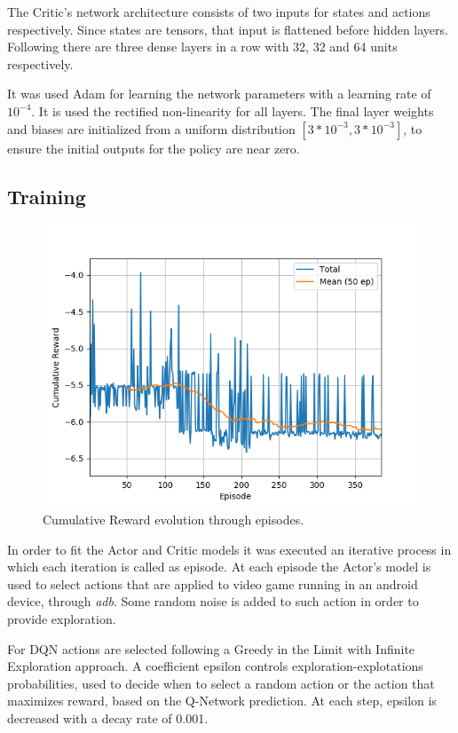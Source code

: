\documentclass[peerreview,onecolumn]{IEEEtran}
\begin{document}
	 The Critic's network architecture consists of two inputs for states and actions respectively. Since states are tensors, that input is flattened before hidden layers. Following there are three dense layers in a row with 32, 32 and 64 units respectively.
	 
	 It was used Adam \cite{adam_2014} for learning the network parameters with a learning rate of $10^{-4}$. It is used the rectified non-linearity \cite{relu_2011} for all layers. The final layer weights and biases are initialized from a uniform distribution $[3 * 10^{-3}, 3 * 10^{-3}]$, to ensure the initial outputs for the policy are near zero.
	 
	 \subsection{Training}
	 
	  \begin{figure}[!h]
		\centering
		\includegraphics[width=0.9\columnwidth]{img/cumulative_reward.png} 
		\caption{Cumulative Reward evolution through episodes.}
		\label{fig:reward}
	\end{figure}
	
	 In order to fit the Actor and Critic models it was executed an iterative process in which each iteration is called as episode. At each episode the Actor's model is used to select actions that are applied to video game running in an android device, through \textit{adb}. Some random noise is added to such action in order to provide exploration.
	 
	 For DQN actions are selected following a Greedy in the Limit with Infinite Exploration approach. A coefficient epsilon controls exploration-explotations probabilities, used to decide when to select a random action or the action that maximizes reward, based on the Q-Network prediction. At each step, epsilon is decreased with a decay rate of 0.001.
	 
\end{document}
